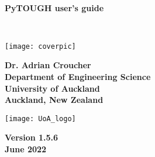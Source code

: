 \begin{titlepage}

\begin{center}

\bigskip\

\textbf{\Huge{PyTOUGH user's guide}}

\bigskip\

\texttt{[image: coverpic]}

\bigskip

\textbf{\large{Dr. Adrian Croucher\\
Department of Engineering Science\\
University of Auckland\\
Auckland, New Zealand}}

\bigskip
\bigskip
\bigskip

\texttt{[image: UoA\_logo]}

\bigskip
\bigskip
\bigskip
\bigskip

\textbf{\large{Version 1.5.6\\June 2022}}

\end{center}
\end{titlepage}

